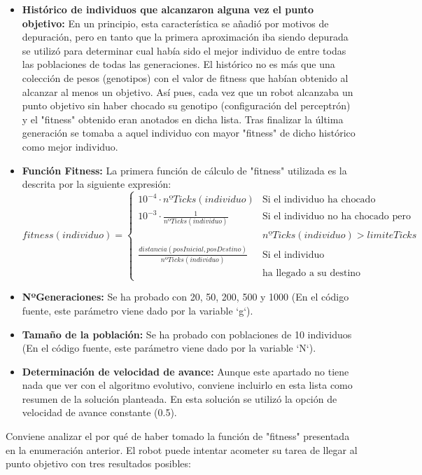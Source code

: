 \documentclass[12pt,spanish]{article}
\begin{document}
\begin{itemize}
	\item{\textbf{Histórico de individuos que alcanzaron alguna vez el punto objetivo:} } En un principio, esta característica se añadió por motivos de depuración, pero en tanto que la primera aproximación iba siendo depurada se utilizó para determinar cual había sido el mejor individuo de entre todas las poblaciones de todas las generaciones. El histórico no es más que una colección de pesos (genotipos) con el valor de fitness que habían obtenido al alcanzar al menos un objetivo. Así pues, cada vez que un robot alcanzaba un punto objetivo sin haber chocado su genotipo (configuración del perceptrón) y el "fitness" obtenido eran anotados en dicha lista. Tras finalizar la última generación se tomaba a aquel individuo con mayor "fitness" de dicho histórico como mejor individuo.
	\item{\textbf{Función Fitness:} } La primera función de cálculo de "fitness" utilizada es la descrita por la siguiente expresión:
	$$fitness(individuo) = \left\{
		\begin{array}{ll}
			10^{-4}\cdot nºTicks(individuo) & \textrm{Si el individuo ha chocado} \\
			10^{-3}\cdot \frac{1}{nºTicks(individuo)} & \textrm{Si el individuo no ha chocado pero }\\
			 &  nºTicks(individuo) > limiteTicks\\
			\frac{distancia(posInicial,posDestino)}{nºTicks(individuo)} & \textrm{Si el individuo}\\
			 & \textrm{ha llegado a su destino}
		\end{array}
	\right.$$
	\item{\textbf{NºGeneraciones: }} Se ha probado con 20, 50, 200, 500 y 1000 (En el código fuente, este parámetro viene dado por la variable `g`).
	\item{\textbf{Tamaño de la población: }} Se ha probado con poblaciones de 10 individuos (En el código fuente, este parámetro viene dado por la variable `N`).
	\item{\textbf{Determinación de velocidad de avance: }} Aunque este apartado no tiene nada que ver con el algoritmo evolutivo, conviene incluirlo en esta lista como resumen de la solución planteada. En esta solución se utilizó la opción de velocidad de avance constante (0.5).
\end{itemize}
Conviene analizar el por qué de haber tomado la función de "fitness" presentada en la enumeración anterior. El robot puede intentar acometer su tarea de llegar al punto objetivo con tres resultados posibles:
\end{document}
